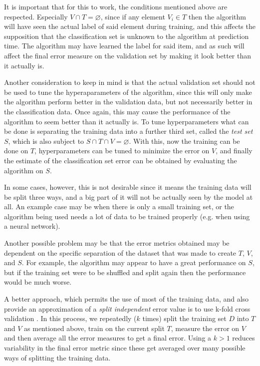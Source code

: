 \documentclass[epsfig,a4paper,11pt,titlepage,twoside,openany]{book}
\begin{document}
It is important that for this to work, the conditions mentioned above are respected. Especially $V \cap T = \varnothing$, since if any element $V_i \in T$ then the algorithm will have seen the actual label of said element during training, and this affects the supposition that the classification set is unknown to the algorithm at prediction time. The algorithm may have learned the label for said item, and as such will affect the final error measure on the validation set by making it look better than it actually is.

Another consideration to keep in mind is that the actual validation set should not be used to tune the hyperaparameters of the algorithm, since this will only make the algorithm perform better in the validation data, but not necessarily better in the classification data. Once again, this may cause the performance of the algorithm to seem better than it actually is. To tune hyperparameters what can be done is separating the training data into a further third set, called the \textit{test set} $S$, which is also subject to $S \cap T \cap V = \varnothing$. With this, now the training can be done on $T$, hyperparameters can be tuned to minimize the error on $V$, and finally the estimate of the classification set error can be obtained by evaluating the algorithm on $S$.

In some cases, however, this is not desirable since it means the training data will be split three ways, and a big part of it will not be actually seen by the model at all. An example case may be when there is only a small training set, or the algorithm being used needs a lot of data to be trained properly (e.g. when using a neural network).

Another possible problem may be that the error metrics obtained may be dependent on the specific separation of the dataset that was made to create $T$, $V$, and $S$. For example, the algorithm may appear to have a great performance on $S$, but if the training set were to be shuffled and split again then the performance would be much worse.

A better approach, which permits the use of most of the training data, and also provide an approximation of a \textit{split independent} error value is to use k-fold cross validation \cite{Kohavi:1995_study_of_cross_validation,Cawley:2010_crossval_model_selection}. In this process, we repeatedly ($k$ times) split the training set $D$ into $T$ and $V$ as mentioned above, train on the current split $T$, measure the error on $V$ and then average all the error measures to get a final error. Using a $k > 1$ reduces variability in the final error metric since these get averaged over many possible ways of splitting the training data.
\end{document}
